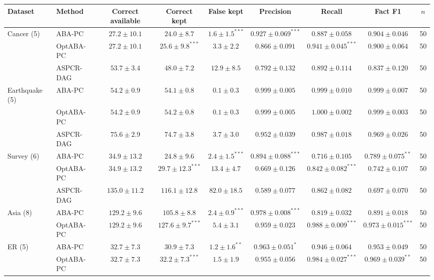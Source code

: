 \begin{table}[t]
\centering
\scriptsize
\setlength{\tabcolsep}{3pt}
\begin{tabular}{llccccccc}
\toprule
Dataset & Method & Correct available & Correct kept & False kept & Precision & Recall & Fact F1 & $n$\\
\midrule
Cancer (5) & ABA-PC & $27.2\pm10.1$ & $24.0\pm8.7$ & $\mathbf{1.6\pm1.5}^{***}$ & $\mathbf{0.927\pm0.069}^{***}$ & $0.887\pm0.058$ & $0.904\pm0.046$ & 50\\
 & OptABA-PC & $27.2\pm10.1$ & $\mathbf{25.6\pm9.8}^{***}$ & $3.3\pm2.2$ & $0.866\pm0.091$ & $\mathbf{0.941\pm0.045}^{***}$ & $0.900\pm0.064$ & 50\\
 & ASPCR-DAG & $53.7\pm3.4$ & $48.0\pm7.2$ & $12.9\pm8.5$ & $0.792\pm0.132$ & $0.892\pm0.114$ & $0.837\pm0.120$ & 50\\
\midrule
Earthquake (5) & ABA-PC & $54.2\pm0.9$ & $54.1\pm0.8$ & $0.1\pm0.3$ & $0.999\pm0.005$ & $0.999\pm0.010$ & $0.999\pm0.007$ & 50\\
 & OptABA-PC & $54.2\pm0.9$ & $54.2\pm0.8$ & $0.1\pm0.3$ & $0.999\pm0.005$ & $1.000\pm0.002$ & $0.999\pm0.003$ & 50\\
 & ASPCR-DAG & $75.6\pm2.9$ & $74.7\pm3.8$ & $3.7\pm3.0$ & $0.952\pm0.039$ & $0.987\pm0.018$ & $0.969\pm0.026$ & 50\\
\midrule
Survey (6) & ABA-PC & $34.9\pm13.2$ & $24.8\pm9.6$ & $\mathbf{2.4\pm1.5}^{***}$ & $\mathbf{0.894\pm0.088}^{***}$ & $0.716\pm0.105$ & $\mathbf{0.789\pm0.075}^{**}$ & 50\\
 & OptABA-PC & $34.9\pm13.2$ & $\mathbf{29.7\pm12.3}^{***}$ & $13.4\pm4.7$ & $0.669\pm0.126$ & $\mathbf{0.842\pm0.082}^{***}$ & $0.742\pm0.107$ & 50\\
 & ASPCR-DAG & $135.0\pm11.2$ & $116.1\pm12.8$ & $82.0\pm18.5$ & $0.589\pm0.077$ & $0.862\pm0.082$ & $0.697\pm0.070$ & 50\\
\midrule
Asia (8) & ABA-PC & $129.2\pm9.6$ & $105.8\pm8.8$ & $\mathbf{2.4\pm0.9}^{***}$ & $\mathbf{0.978\pm0.008}^{***}$ & $0.819\pm0.032$ & $0.891\pm0.018$ & 50\\
 & OptABA-PC & $129.2\pm9.6$ & $\mathbf{127.6\pm9.7}^{***}$ & $5.4\pm3.1$ & $0.959\pm0.023$ & $\mathbf{0.988\pm0.009}^{***}$ & $\mathbf{0.973\pm0.015}^{***}$ & 50\\
\midrule
ER (5) & ABA-PC & $32.7\pm7.3$ & $30.9\pm7.3$ & $\mathbf{1.2\pm1.6}^{**}$ & $\mathbf{0.963\pm0.051}^{*}$ & $0.946\pm0.064$ & $0.953\pm0.049$ & 50\\
 & OptABA-PC & $32.7\pm7.3$ & $\mathbf{32.2\pm7.3}^{***}$ & $1.5\pm1.9$ & $0.955\pm0.056$ & $\mathbf{0.984\pm0.027}^{***}$ & $\mathbf{0.969\pm0.039}^{**}$ & 50\\

\end{tabular}
\end{table}
